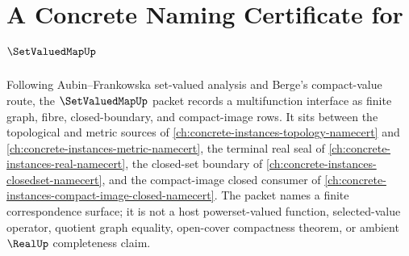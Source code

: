 \chapter{A Concrete Naming Certificate for $\SetValuedMapUp$}
\label{ch:concrete-instances-set-valued-map-namecert}

Following Aubin--Frankowska set-valued analysis and Berge's compact-value route, the $\SetValuedMapUp$ packet records a multifunction interface as finite graph, fibre, closed-boundary, and compact-image rows. It sits between the topological and metric sources of \autoref{ch:concrete-instances-topology-namecert} and \autoref{ch:concrete-instances-metric-namecert}, the terminal real seal of \autoref{ch:concrete-instances-real-namecert}, the closed-set boundary of \autoref{ch:concrete-instances-closedset-namecert}, and the compact-image closed consumer of \autoref{ch:concrete-instances-compact-image-closed-namecert}. The packet names a finite correspondence surface; it is not a host powerset-valued function, selected-value operator, quotient graph equality, open-cover compactness theorem, or ambient $\RealUp$ completeness claim.

